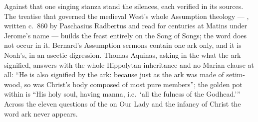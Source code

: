 Against that one singing stanza stand the silences, each verified in
its sources. The treatise that governed the medieval
West's whole Assumption theology --- , written
c.~860 by Paschasius Radbertus and read for centuries at Matins under
Jerome's name --- builds the feast entirely on the Song of Songs; the
word  does not occur in it. Bernard's Assumption sermons
contain one ark only, and it is Noah's, in an ascetic digression.
Thomas Aquinas, asking in the  what the ark signified,
answers with the whole Hippolytan inheritance and no Marian clause at
all: ``He is also signified by the ark: because just as the ark was
made of setim-wood, so was Christ's body composed of most pure
members''; the golden pot within is ``His holy soul, having manna,
i.e.\ `all the fulness of the Godhead.'\thinspace'' Across the eleven
questions of the  on Our Lady and the infancy of Christ
the word ark never appears.

